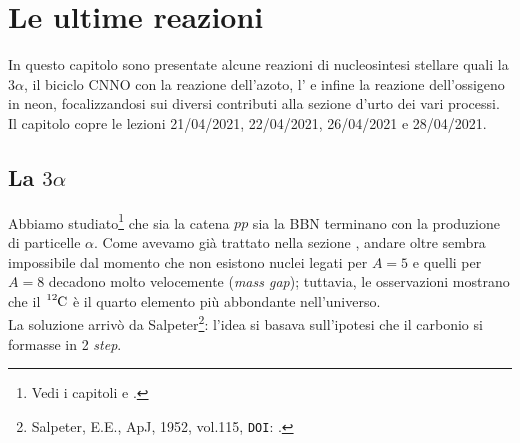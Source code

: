 \chapter{Le ultime reazioni}
In questo capitolo sono presentate alcune reazioni di nucleosintesi stellare quali la 3$\alpha$, il biciclo CNNO con la reazione dell'azoto, l' e infine la reazione dell'ossigeno in neon, focalizzandosi sui diversi contributi alla sezione d'urto dei vari processi. Il capitolo copre le lezioni 21/04/2021, 22/04/2021, 26/04/2021 e 28/04/2021. 

\section{La $3\alpha$}
Abbiamo studiato\footnote{Vedi i capitoli  e .} che sia la catena $pp$ sia la BBN terminano con la produzione di particelle $\alpha$. Come avevamo già trattato nella sezione , andare oltre sembra impossibile dal momento che non esistono nuclei legati per $A=5$ e quelli per $A=8$ decadono molto velocemente (\textit{mass gap}); tuttavia, le osservazioni mostrano che il $\ce{^{12}C}$ è il quarto elemento più abbondante nell'universo.\\ 
La soluzione arrivò da Salpeter\footnote{Salpeter, E.E., ApJ, 1952, vol.115, \texttt{DOI}: .}: l'idea si basava sull'ipotesi che il carbonio si formasse in 2 \textit{step}.

